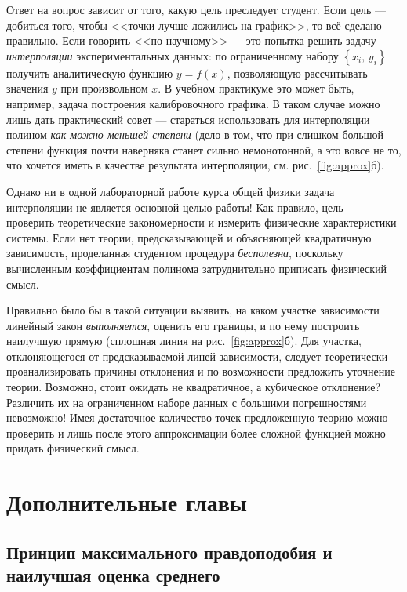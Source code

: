 \documentclass[10pt]{article}
\begin{document}
{\footnotesize
Ответ на вопрос зависит от того, какую цель преследует
студент. Если цель --- добиться того, чтобы <<точки
лучше ложились на график>>, то всё сделано правильно.
Если говорить <<по-научному>> ---
это попытка решить задачу \emph{интерполяции}
экспериментальных данных: по ограниченному набору $\left\{ x_{i},\,y_{i}\right\} $
получить аналитическую функцию $y=f\!\left(x\right)$, позволяющую
рассчитывать значения $y$ при произвольном $x$. В учебном практикуме
это может быть, например, задача построения калибровочного графика.
В таком случае можно лишь дать практический совет --- стараться
использовать для интерполяции полином \emph{как можно
меньшей степени} (дело в том, что при слишком большой
степени функция почти наверняка станет сильно немонотонной, а это
вовсе не то, что хочется иметь в качестве результата интерполяции,
см. рис.~\ref{fig:approx}б).

Однако ни в одной лабораторной работе курса общей
физики задача интерполяции не является основной целью работы! Как
правило, цель --- проверить теоретические закономерности
и измерить физические характеристики системы. Если нет теории, предсказывающей
и объясняющей квадратичную зависимость, проделанная студентом процедура
\emph{бесполезна}, поскольку вычисленным коэффициентам полинома затруднительно 
приписать физический смысл.

Правильно было бы в такой ситуации выявить, на каком
участке зависимости линейный закон \emph{выполняется},
оценить его границы, и по нему построить наилучшую прямую (сплошная
линия на рис.~\ref{fig:approx}б). Для участка, отклоняющегося от
предсказываемой линей зависимости, следует теоретически проанализировать
причины отклонения и по возможности предложить уточнение теории. Возможно,
стоит ожидать не квадратичное, а кубическое отклонение? Различить
их на ограниченном наборе данных с большими погрешностями невозможно!
Имея достаточное количество точек предложенную теорию можно проверить
и лишь после этого аппроксимации более сложной функцией можно придать
физический смысл.\par
}%

\section{Дополнительные главы}

\small

\subsection{Принцип максимального правдоподобия и наилучшая оценка среднего}
\end{document}
